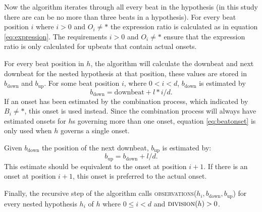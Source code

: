 Now the algorithm iterates through all every beat in the hypothesis (in this study there are can be no more than three beats in a hypothesis). For every beat position $i$ where $i > 0$ and $O_i \neq *$ the expression ratio is calculated as in equation \ref{eq:expression}. The requirements $i > 0$ and $O_i \neq *$ ensure that the expression ratio is only calculated for upbeats that contain actual onsets. 

For every beat position in $h$, the algorithm will calculate the downbeat and next downbeat for the nested hypothesis at that position, these values are stored in $b_{\mathrm{down}}$ and $b_{\mathrm{up}}$. 
For some beat position $i$, where $0 < i < d$, $b_{\mathrm{down}}$ is estimated by
\begin{equation}
\label{eq:beatonset}
b_{\mathrm{down}} = \mathrm{downbeat} + l * i/d.
\end{equation}
If an onset has been estimated by the combination process, which indicated by $B_i \neq *$, this onset is used instead. Since the combination process will always have estimated onsets for $h$s governing more than one onset, equation \ref{eq:beatonset} is only used when $h$ governs a single onset.

Given $b_{\mathrm{down}}$ the position of the next downbeat, $b_{\mathrm{up}}$ is estimated by:
\begin{equation}
b_{\mathrm{up}} = b_{\mathrm{down}} + l/d.
\end{equation}
This estimate should be equivalent to the onset at position $i+1$. If there is an onset at position $i+1$, this onset is preferred to the actual onset.

Finally, the recursive step of the algorithm calls \textsc{observations}($h_i, b_{\mathrm{down}}, b_{\mathrm{up}}$) for every nested hypothesis $h_i$ of $h$ where $0 \leq i < d$ and $\textsc{division}(h) > 0$.


